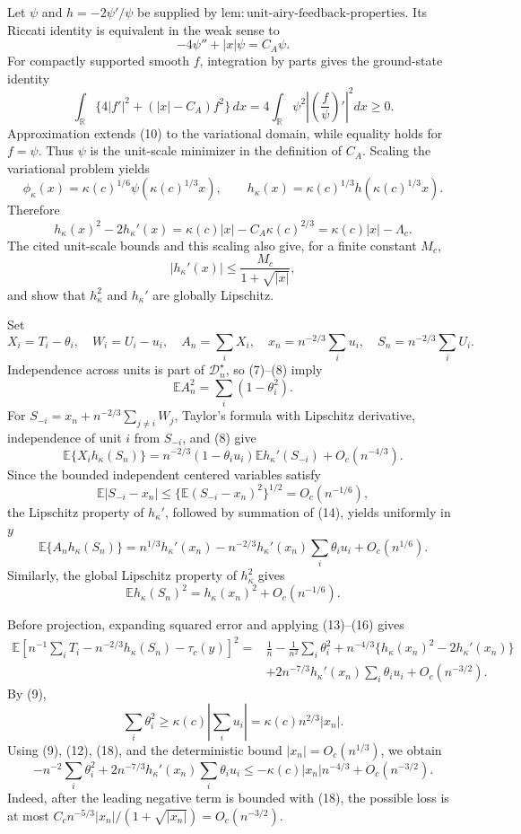 Let \(\psi\) and \(h=-2\psi'/\psi\) be supplied by \(\mathrm{lem:unit\text{-}airy\text{-}feedback\text{-}properties}\).  Its Riccati identity is equivalent in the weak sense to
\[
-4\psi''+|x|\psi=C_A\psi.
\]
For compactly supported smooth \(f\), integration by parts gives the ground-state identity
\[
\int_{\mathbb R}\{4|f'|^2+(|x|-C_A)f^2\}\,dx
=4\int_{\mathbb R}\psi^2\left|\left(\frac f\psi\right)'\right|^2dx\ge0.
\tag{10}
\]
Approximation extends (10) to the variational domain, while equality holds for \(f=\psi\).  Thus \(\psi\) is the unit-scale minimizer in the definition of \(C_A\).  Scaling the variational problem yields
\[
\phi_\kappa(x)=\kappa(c)^{1/6}\psi(\kappa(c)^{1/3}x),
\qquad
h_\kappa(x)=\kappa(c)^{1/3}h(\kappa(c)^{1/3}x).
\]
Therefore
\[
h_\kappa(x)^2-2h_\kappa'(x)
=\kappa(c)|x|-C_A\kappa(c)^{2/3}
=\kappa(c)|x|-\Lambda_c.
\tag{11}
\]
The cited unit-scale bounds and this scaling also give, for a finite constant \(M_c\),
\[
|h_\kappa'(x)|\le\frac{M_c}{1+\sqrt{|x|}},
\tag{12}
\]
and show that \(h_\kappa^2\) and \(h_\kappa'\) are globally Lipschitz.

Set
\[
X_i=T_i-\theta_i,\quad W_i=U_i-u_i,\quad
A_n=\sum_iX_i,\quad x_n=n^{-2/3}\sum_i u_i,\quad
S_n=n^{-2/3}\sum_iU_i.
\]
Independence across units is part of \(\mathcal D_n^\star\), so (7)--(8) imply
\[
\mathbb EA_n^2=\sum_i(1-\theta_i^2).
\tag{13}
\]
For \(S_{-i}=x_n+n^{-2/3}\sum_{j\ne i}W_j\), Taylor's formula with Lipschitz derivative, independence of unit \(i\) from \(S_{-i}\), and (8) give
\[
\mathbb E\{X_ih_\kappa(S_n)\}
=n^{-2/3}(1-\theta_iu_i)\mathbb Eh_\kappa'(S_{-i})+O_c(n^{-4/3}).
\tag{14}
\]
Since the bounded independent centered variables satisfy
\[
\mathbb E|S_{-i}-x_n|
\le\{\mathbb E(S_{-i}-x_n)^2\}^{1/2}=O_c(n^{-1/6}),
\]
the Lipschitz property of \(h_\kappa'\), followed by summation of (14), yields uniformly in \(y\)
\[
\mathbb E\{A_nh_\kappa(S_n)\}
=n^{1/3}h_\kappa'(x_n)
-n^{-2/3}h_\kappa'(x_n)\sum_i\theta_iu_i
+O_c(n^{1/6}).
\tag{15}
\]
Similarly, the global Lipschitz property of \(h_\kappa^2\) gives
\[
\mathbb Eh_\kappa(S_n)^2=h_\kappa(x_n)^2+O_c(n^{-1/6}).
\tag{16}
\]

Before projection, expanding squared error and applying (13)--(16) gives
\[
\begin{split}
\mathbb E\left[n^{-1}\sum_iT_i-n^{-2/3}h_\kappa(S_n)-\tau_c(y)\right]^2
={}&\frac1n-\frac1{n^2}\sum_i\theta_i^2
+n^{-4/3}\{h_\kappa(x_n)^2-2h_\kappa'(x_n)\}\\
&+2n^{-7/3}h_\kappa'(x_n)\sum_i\theta_iu_i+O_c(n^{-3/2}).
\end{split}
\tag{17}
\]
By (9),
\[
\sum_i\theta_i^2\ge\kappa(c)\left|\sum_i u_i\right|
=\kappa(c)n^{2/3}|x_n|.
\tag{18}
\]
Using (9), (12), (18), and the deterministic bound \(|x_n|=O_c(n^{1/3})\), we obtain
\[
-n^{-2}\sum_i\theta_i^2
+2n^{-7/3}h_\kappa'(x_n)\sum_i\theta_iu_i
\le-\kappa(c)|x_n|n^{-4/3}+O_c(n^{-3/2}).
\tag{19}
\]
Indeed, after the leading negative term is bounded with (18), the possible loss is at most
\(C_cn^{-5/3}|x_n|/(1+\sqrt{|x_n|})=O_c(n^{-3/2})\).


